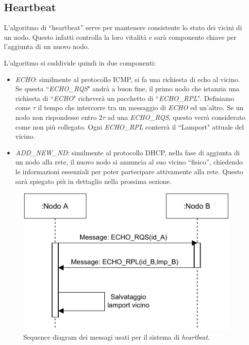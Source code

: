 \documentclass{memoir}
\begin{document}
\subsection{Heartbeat}\label{heartbeat}
L'algoritmo di ``heartbeat'' serve per mantenere consistente lo stato dei vicini
	   di un nodo. Questo infatti controlla la loro vitalità e sarà componente chiave
	   per l'aggiunta di un nuovo nodo.

L'algoritmo si suddivide quindi in due componenti:
\begin{itemize}
	\item \textit{ECHO}: similmente al protocollo ICMP, si fa una richiesta di echo
	   al vicino. Se questa ``\textit{ECHO\_RQS}" andrà a buon fine, il primo nodo che
	   istanzia una richiesta di ``\textit{ECHO}" richeverà un pacchetto di ``\textit{ECHO\_RPL}".
	   Definiamo come $\tau$ il tempo che intercorre tra un messaggio di \textit{ECHO} ed
	   un'altro. Se un nodo non rispondesse entro $2\tau$ ad una \textit{ECHO\_RQS}, questo
	   verrà considerato come non più collegato. Ogni \textit{ECHO\_RPL} conterrà il ``Lamport"
	   attuale del vicino.
	\item \textit{ADD\_NEW\_ND}: similmente al protocollo DHCP, nella fase di aggiunta
	   di un nodo alla rete, il nuovo nodo si annuncia al suo vicino ``fisico'', chiedendo
	   le informazioni essenziali per poter partecipare attivamente alla rete. Questo sarà
	   spiegato più in dettaglio nella prossima sezione.
\end{itemize}

\begin{figure}[h]
\centering
\includegraphics{HeartbeatDiagram.pdf}
\caption{Sequence diagram dei messagi usati per il sistema di \textit{heartbeat}.}
\label{img:heartbeat}
\end{figure}
\end{document}
